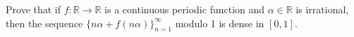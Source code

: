 Prove that if $f\colon \mathbb{R} \to \mathbb{R}$ is a continuous periodic function and $\alpha \in \mathbb{R}$ is irrational, then the sequence $\{n\alpha+f(n\alpha)\}_{n=1}^{\infty}$  modulo 1 is dense in $[0,1]$.